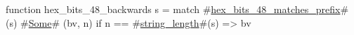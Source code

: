 function hex_bits_48_backwards s =
  match #\hyperref[sailRISCVzhexzybitszy48zymatcheszyprefix]{hex\_bits\_48\_matches\_prefix}#(s) {
      #\hyperref[sailRISCVzSome]{Some}# (bv, n) if n == #\hyperref[sailRISCVzstringzylength]{string\_length}#(s) => bv
  }
